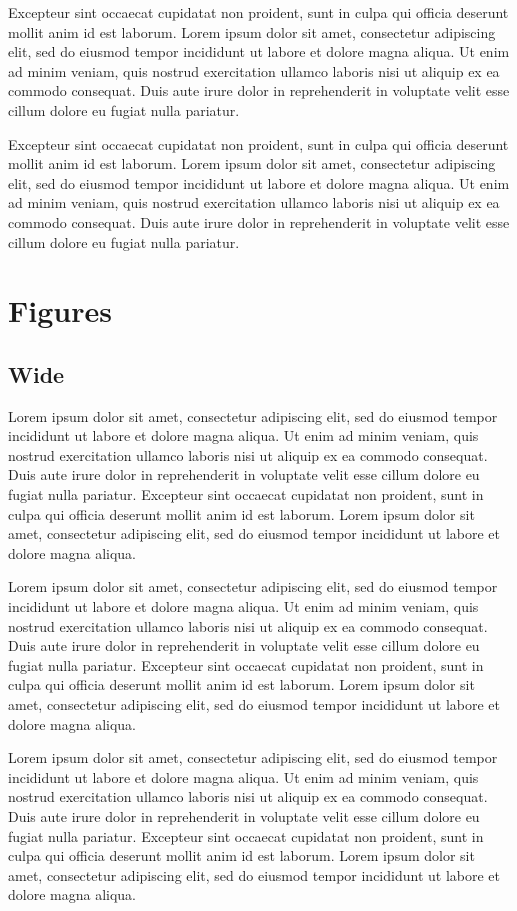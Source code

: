 \documentclass[10pt,conference,a4paper,onecolumn] {IEEEtran}
\begin{document}
\begin{multicols}{2}
Excepteur sint occaecat cupidatat non proident, sunt in culpa qui officia deserunt mollit anim id est laborum. Lorem ipsum dolor sit amet, consectetur adipiscing elit, sed do eiusmod tempor incididunt ut labore et dolore magna aliqua. Ut enim ad minim veniam, quis nostrud exercitation ullamco laboris nisi ut aliquip ex ea commodo consequat. Duis aute irure dolor in reprehenderit in voluptate velit esse cillum dolore eu fugiat nulla pariatur.

Excepteur sint occaecat cupidatat non proident, sunt in culpa qui officia deserunt mollit anim id est laborum. Lorem ipsum dolor sit amet, consectetur adipiscing elit, sed do eiusmod tempor incididunt ut labore et dolore magna aliqua. Ut enim ad minim veniam, quis nostrud exercitation ullamco laboris nisi ut aliquip ex ea commodo consequat. Duis aute irure dolor in reprehenderit in voluptate velit esse cillum dolore eu fugiat nulla pariatur.

\section{Figures}

\subsection{Wide}

Lorem ipsum dolor sit amet, consectetur adipiscing elit, sed do eiusmod tempor incididunt ut labore et dolore magna aliqua. Ut enim ad minim veniam, quis nostrud exercitation ullamco laboris nisi ut aliquip ex ea commodo consequat. Duis aute irure dolor in reprehenderit in voluptate velit esse cillum dolore eu fugiat nulla pariatur. Excepteur sint occaecat cupidatat non proident, sunt in culpa qui officia deserunt mollit anim id est laborum. Lorem ipsum dolor sit amet, consectetur adipiscing elit, sed do eiusmod tempor incididunt ut labore et dolore magna aliqua.

Lorem ipsum dolor sit amet, consectetur adipiscing elit, sed do eiusmod tempor incididunt ut labore et dolore magna aliqua. Ut enim ad minim veniam, quis nostrud exercitation ullamco laboris nisi ut aliquip ex ea commodo consequat. Duis aute irure dolor in reprehenderit in voluptate velit esse cillum dolore eu fugiat nulla pariatur. Excepteur sint occaecat cupidatat non proident, sunt in culpa qui officia deserunt mollit anim id est laborum. Lorem ipsum dolor sit amet, consectetur adipiscing elit, sed do eiusmod tempor incididunt ut labore et dolore magna aliqua.

Lorem ipsum dolor sit amet, consectetur adipiscing elit, sed do eiusmod tempor incididunt ut labore et dolore magna aliqua. Ut enim ad minim veniam, quis nostrud exercitation ullamco laboris nisi ut aliquip ex ea commodo consequat. Duis aute irure dolor in reprehenderit in voluptate velit esse cillum dolore eu fugiat nulla pariatur. Excepteur sint occaecat cupidatat non proident, sunt in culpa qui officia deserunt mollit anim id est laborum. Lorem ipsum dolor sit amet, consectetur adipiscing elit, sed do eiusmod tempor incididunt ut labore et dolore magna aliqua.


\end{multicols}
\end{document}
